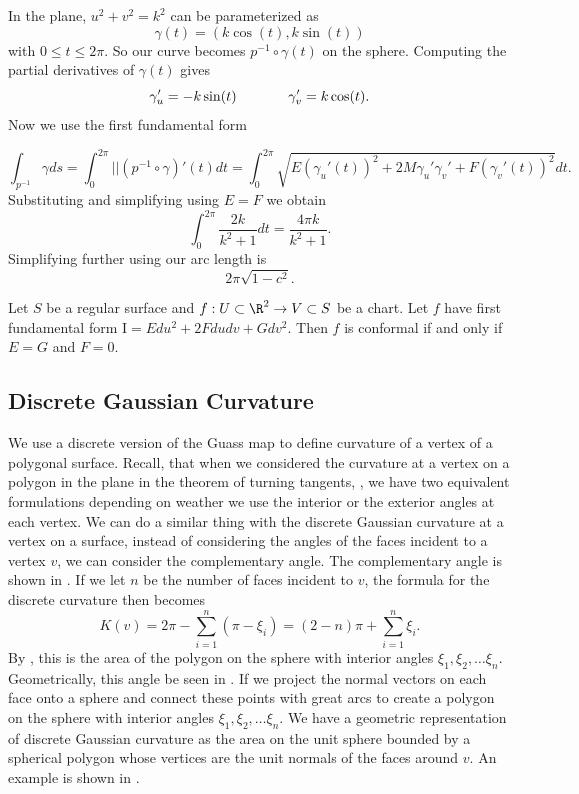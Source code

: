 \begin{example}
In the plane, $u^2+v^2=k^2$ can be parameterized
as $$\gamma(t)=(k\cos(t),k\sin(t))$$ with $0\leq t\leq 2\pi.$
So our curve becomes $p^{-1}\circ \gamma(t)$ on the sphere.
Computing the partial derivatives of $\gamma(t)$ gives
$$\gamma_u'=-k\sin(t)\hspace{1.3cm}  \gamma_v'=k\cos(t).$$
Now we use the first fundamental form

$$\int_{p^{-1}}\gamma ds=\int_{0}^{2\pi} ||(p^{-1}\circ \gamma)'(t)dt=\int_0^{2\pi}\sqrt{E(\gamma_u'(t))^2+2M\gamma_u'\gamma_v'+
F(\gamma_v'(t))^2}dt.$$
Substituting and simplifying using $E=F$ we obtain
$$\int_0^{2\pi}\frac{2k}{k^2+1}dt=\frac{4\pi k}{k^2+1}.$$
Simplifying further using   our arc length is
$$2\pi\sqrt{1-c^2}.$$

\end{example}



\begin{theorem}\label{thm:first-conformal}
	Let $S$ be a regular surface and $f:U\subset \R^2 \to V\subset S$ be a chart.
	Let $f$ have first fundamental form $\mathrm{I}=Edu^2+2Fdudv +Gdv^2$.
	Then $f$ is conformal if and only if $E=G$ and $F=0.$
\end{theorem}

\subsection{Discrete Gaussian Curvature}
\label{sec:discrete}


We use a discrete version of the Guass map to define curvature
of a vertex of a polygonal surface.
Recall, that when we considered the curvature at a vertex on a polygon in the plane
in the theorem of turning tangents, , we have two equivalent
formulations depending on
weather we use the interior or the exterior angles at each vertex.
We can do a similar thing with the discrete Gaussian curvature at a vertex on a surface,
instead of considering the angles of the faces incident to a vertex $v$, we can consider
the complementary angle. The complementary angle is shown in . 
If we let $n$ be the number of faces
incident to $v$, the formula for the discrete curvature then becomes
\begin{equation}\label{eqn:discrete-curvature-complement-angle}
K(v)=2\pi - \sum_{i=1}^n (\pi - \xi_i)=(2-n)\pi +\sum_{i=1}^n \xi_i.
\end{equation}
By , this is the area of the polygon on the sphere with interior
angles $\xi_1, \xi_2,\ldots \xi_n.$
Geometrically, this angle be seen in .
If we project the normal vectors on each face onto a sphere and
connect these points with great arcs to create a polygon on the sphere with interior angles
$\xi_1, \xi_2,\ldots \xi_n.$
We have a geometric representation of discrete
Gaussian curvature as the area on the unit 
sphere bounded by a spherical polygon whose vertices are the unit normals of 
the faces around $v$. An example is shown in .

